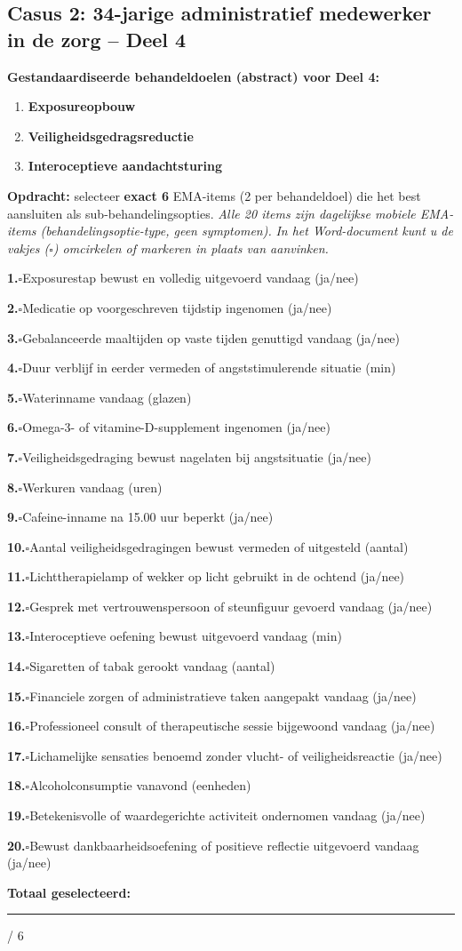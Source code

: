 \documentclass[11pt,a4paper]{article}
\newcommand{\checkitemBFS}[2]{%
\noindent\small\textbf{#1.}\hspace{0.45em}$\square$\hspace{0.4em}#2\par\vspace{0.20em}}
\begin{document}
\vspace{0.6em}
\newpage
\subsection*{Casus 2: 34-jarige administratief medewerker in de zorg -- Deel 4}

\begin{contextbox}
\small\textbf{Gestandaardiseerde behandeldoelen (abstract) voor Deel 4:}
\begin{enumerate}[topsep=2pt,itemsep=1pt,label=\arabic*.]
\item \textbf{Exposureopbouw}
\item \textbf{Veiligheidsgedragsreductie}
\item \textbf{Interoceptieve aandachtsturing}
\end{enumerate}
\end{contextbox}

\begin{responsebox}
\small\textbf{Opdracht:} selecteer \textbf{exact 6} EMA-items (2 per behandeldoel) die het best aansluiten als sub-behandelingsopties.
\textit{Alle 20 items zijn dagelijkse mobiele EMA-items (behandelingsoptie-type, geen symptomen).}
\textit{In het Word-document kunt u de vakjes ($\square$) omcirkelen of markeren in plaats van aanvinken.}

\checkitemBFS{1}{Exposurestap bewust en volledig uitgevoerd vandaag (ja/nee)}
\checkitemBFS{2}{Medicatie op voorgeschreven tijdstip ingenomen (ja/nee)}
\checkitemBFS{3}{Gebalanceerde maaltijden op vaste tijden genuttigd vandaag (ja/nee)}
\checkitemBFS{4}{Duur verblijf in eerder vermeden of angststimulerende situatie (min)}
\checkitemBFS{5}{Waterinname vandaag (glazen)}
\checkitemBFS{6}{Omega-3- of vitamine-D-supplement ingenomen (ja/nee)}
\checkitemBFS{7}{Veiligheidsgedraging bewust nagelaten bij angstsituatie (ja/nee)}
\checkitemBFS{8}{Werkuren vandaag (uren)}
\checkitemBFS{9}{Cafeine-inname na 15.00 uur beperkt (ja/nee)}
\checkitemBFS{10}{Aantal veiligheidsgedragingen bewust vermeden of uitgesteld (aantal)}
\checkitemBFS{11}{Lichttherapielamp of wekker op licht gebruikt in de ochtend (ja/nee)}
\checkitemBFS{12}{Gesprek met vertrouwenspersoon of steunfiguur gevoerd vandaag (ja/nee)}
\checkitemBFS{13}{Interoceptieve oefening bewust uitgevoerd vandaag (min)}
\checkitemBFS{14}{Sigaretten of tabak gerookt vandaag (aantal)}
\checkitemBFS{15}{Financiele zorgen of administratieve taken aangepakt vandaag (ja/nee)}
\checkitemBFS{16}{Professioneel consult of therapeutische sessie bijgewoond vandaag (ja/nee)}
\checkitemBFS{17}{Lichamelijke sensaties benoemd zonder vlucht- of veiligheidsreactie (ja/nee)}
\checkitemBFS{18}{Alcoholconsumptie vanavond (eenheden)}
\checkitemBFS{19}{Betekenisvolle of waardegerichte activiteit ondernomen vandaag (ja/nee)}
\checkitemBFS{20}{Bewust dankbaarheidsoefening of positieve reflectie uitgevoerd vandaag (ja/nee)}
\vspace{0.4em}
\noindent\textbf{Totaal geselecteerd:}\hspace{0.5em}\rule{1.2cm}{0.25pt}\hspace{0.2em}/ 6
\end{responsebox}
\end{document}
